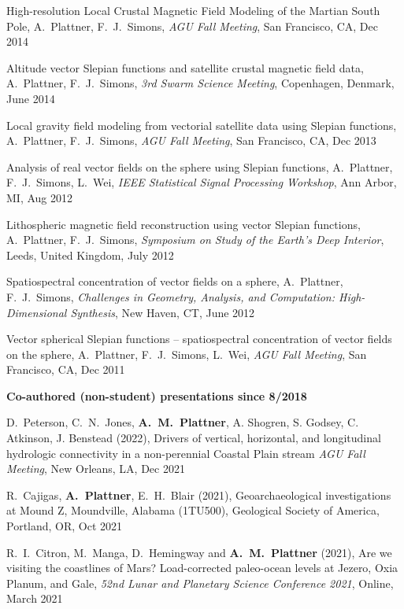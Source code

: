 \documentclass[10pt]{article}
\begin{document}
\spcp
High-resolution Local Crustal Magnetic Field Modeling of the Martian South Pole,
A.~Plattner,  F.~J.~Simons,
\emph{AGU Fall Meeting}, San Francisco, CA, Dec 2014

\spcp
Altitude vector Slepian functions and satellite crustal magnetic field data,
A.~Plattner,  F.~J.~Simons,
\emph{3rd Swarm Science Meeting}, Copenhagen, Denmark, June 2014

\spcp
Local gravity field modeling from vectorial satellite data using Slepian functions,
A.~Plattner,  F.~J.~Simons,
\emph{AGU Fall Meeting}, San Francisco, CA, Dec 2013

\spcp
Analysis of real vector fields on the sphere using Slepian functions,
A.~Plattner, F.~J.~Simons, L.~Wei,
\emph{IEEE Statistical Signal Processing Workshop}, Ann Arbor, MI, Aug 2012

\spcp
Lithospheric magnetic field reconstruction using vector Slepian functions,
A.~Plattner, F.~J.~Simons,
\emph{Symposium on Study of the Earth's Deep Interior}, Leeds, United Kingdom, July 2012

%

\spcp
Spatiospectral concentration of vector fields on a sphere,
A.~Plattner, F.~J.~Simons,
\emph{Challenges in Geometry, Analysis, and Computation: High-Dimensional Synthesis}, 
New Haven, CT, June 2012

\spcp
Vector spherical Slepian functions -- spatiospectral concentration of vector fields on the sphere,
A.~Plattner, F.~J.~Simons, L.~Wei,
\emph{AGU Fall Meeting}, San Francisco, CA, Dec 2011


\spc
\textbf{\tsize Co-authored (non-student) presentations since 8/2018}

\spcp
D.~Peterson, C.~N.~Jones, \textbf{A.~M.~Plattner}, A. Shogren, S. Godsey, C. Atkinson, J. Benstead (2022),
Drivers of vertical, horizontal, and longitudinal hydrologic connectivity in a non-perennial Coastal Plain stream
\emph{AGU Fall Meeting}, New Orleans, LA, Dec 2021

\spcp
R.~Cajigas, \textbf{A.~Plattner}, E.~H.~Blair (2021),
Geoarchaeological investigations at Mound Z, Moundville, Alabama
(1TU500), Geological Society of America, Portland, OR, Oct 2021

\spcp
R.~I.~Citron, M.~Manga, D.~Hemingway and \textbf{A.~M.~Plattner} (2021),
Are we visiting the coastlines of Mars? Load-corrected paleo-ocean levels at Jezero, Oxia Planum, and Gale,
\emph{52nd Lunar and Planetary Science Conference 2021}, Online, March 2021
\end{document}
